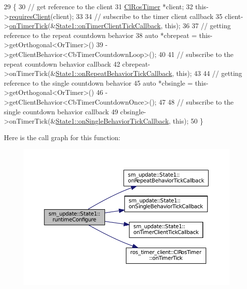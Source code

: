 \begin{DoxyCode}
29     \{
30         \textcolor{comment}{// get reference to the client}
31         \hyperlink{classros__timer__client_1_1ClRosTimer}{ClRosTimer} *client;
32         this->\hyperlink{classsmacc_1_1ISmaccState_a7f95c9f0a6ea2d6f18d1aec0519de4ac}{requiresClient}(client);
33 
34         \textcolor{comment}{// subscribe to the timer client callback}
35         client->\hyperlink{classros__timer__client_1_1ClRosTimer_a06ecf6427b5df59f29879ab3bd1f120c}{onTimerTick}(&\hyperlink{structsm__update_1_1State1_ab4f7a38bc5323775b20ba5e8cc815a18}{State1::onTimerClientTickCallback},
       \textcolor{keyword}{this});
36 
37         \textcolor{comment}{// getting reference to the repeat countdown behavior}
38         \textcolor{keyword}{auto} *cbrepeat = this->getOrthogonal<OrTimer>()
39                              ->getClientBehavior<CbTimerCountdownLoop>();
40 
41         \textcolor{comment}{// subscribe to the repeat countdown behavior callback}
42         cbrepeat->onTimerTick(&\hyperlink{structsm__update_1_1State1_ada025d5bb975eccc8fc7850bbb90f5dc}{State1::onRepeatBehaviorTickCallback}, \textcolor{keyword}{
      this});
43 
44         \textcolor{comment}{// getting reference to the single countdown behavior}
45         \textcolor{keyword}{auto} *cbsingle = this->getOrthogonal<OrTimer>()
46                              ->getClientBehavior<CbTimerCountdownOnce>();
47 
48         \textcolor{comment}{// subscribe to the single countdown behavior callback}
49         cbsingle->onTimerTick(&\hyperlink{structsm__update_1_1State1_a88f30ef150b79e26b3c93a50a8dc1fa1}{State1::onSingleBehaviorTickCallback}, \textcolor{keyword}{
      this});
50     \}
\end{DoxyCode}


Here is the call graph for this function\+:
\nopagebreak
\begin{figure}[H]
\begin{center}
\leavevmode
\includegraphics[width=350pt]{structsm__update_1_1State1_ab41d1931619e35f24f6c7b6e6e6d0316_cgraph}
\end{center}
\end{figure}


